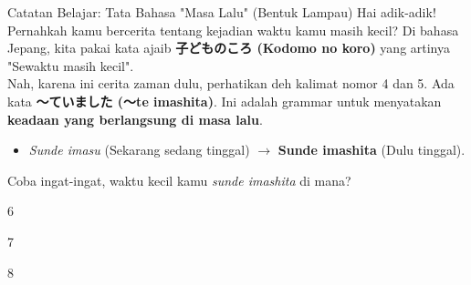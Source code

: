 \begin{lessonbox}{Catatan Belajar: Tata Bahasa "Masa Lalu" (Bentuk Lampau)}
    Hai adik-adik! Pernahkah kamu bercerita tentang kejadian waktu kamu masih kecil? Di bahasa Jepang, kita pakai kata ajaib \textbf{子どものころ (Kodomo no koro)} yang artinya "Sewaktu masih kecil".\\
    
    Nah, karena ini cerita zaman dulu, perhatikan deh kalimat nomor 4 dan 5. Ada kata \textbf{〜ていました (〜te imashita)}. Ini adalah grammar untuk menyatakan \textbf{keadaan yang berlangsung di masa lalu}.
    \begin{itemize}
        \item \textit{Sunde imasu} (Sekarang sedang tinggal) $\rightarrow$ \textbf{Sunde imashita} (Dulu tinggal).
    \end{itemize}
    Coba ingat-ingat, waktu kecil kamu \textit{sunde imashita} di mana?
\end{lessonbox}

\begin{convobox}{6}
    \noindent
      

    \vspace{1.5em}
\end{convobox}

\begin{convobox}{7}
    \noindent
      
      

    \vspace{1.5em}
\end{convobox}

\begin{convobox}{8}
    \noindent
      
      
      

    \vspace{1.5em}
\end{convobox}


